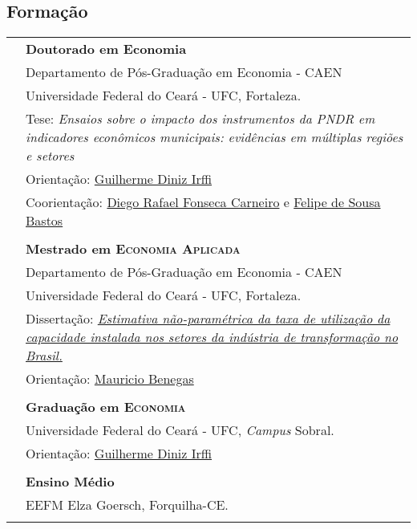 \documentclass[a4paper,12pt]{article}
\begin{document}
	\subsection*{Formação}
	\setlength{\LTleft}{0pt}
	\begin{longtable}[t]{>{\raggedleft\arraybackslash}p{2.0cm}>{\raggedright\arraybackslash}p{13.5cm}}
		2025 & \textbf{Doutorado em Economia} \\
		& Departamento de Pós-Graduação em Economia - CAEN \\
		& Universidade Federal do Ceará - UFC, Fortaleza. \\
		& Tese: \textit{Ensaios sobre o impacto dos instrumentos da PNDR em indicadores econômicos municipais: evidências em múltiplas regiões e setores} \\
		& Orientação: \href{http://lattes.cnpq.br/8821559850261716}{Guilherme Diniz Irffi} \\
		& Coorientação: \href{http://lattes.cnpq.br/4199618744331611}{Diego Rafael Fonseca Carneiro} e \href{http://lattes.cnpq.br/5346220628829577}{Felipe de Sousa Bastos} \\
		\multicolumn{2}{c}{\vspace{-0.2cm}} \\

		2016 & \textbf{Mestrado em \textsc{Economia Aplicada}} \\
		& Departamento de Pós-Graduação em Economia - CAEN \\
		& Universidade Federal do Ceará - UFC, Fortaleza. \\
		& Dissertação: \href{http://repositorio.ufc.br/handle/riufc/29291}{\textit{Estimativa não-paramétrica da taxa de utilização da capacidade instalada nos setores da indústria de transformação no Brasil.}} \\
		& Orientação: \href{http://lattes.cnpq.br/6095762582986164}{Mauricio Benegas} \\
		\multicolumn{2}{c}{\vspace{-0.2cm}} \\

		2013 & \textbf{Graduação em \textsc{Economia}} \\
		& Universidade Federal do Ceará - UFC, \textit{Campus} Sobral. \\
		& Orientação: \href{http://lattes.cnpq.br/8821559850261716}{Guilherme Diniz Irffi} \\
		\multicolumn{2}{c}{\vspace{-0.2cm}} \\

		2006 & \textbf{Ensino Médio} \\
		& EEFM Elza Goersch, Forquilha-CE. \\
		\multicolumn{2}{c}{\vspace{-0.2cm}} \\
	\end{longtable}
\end{document}
